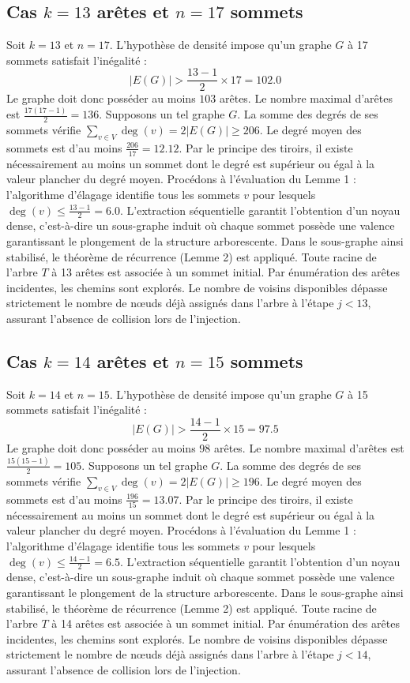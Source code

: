 \documentclass[12pt,a4paper]{article}
\begin{document}
\subsection{Cas $k = 13$ arêtes et $n = 17$ sommets}
Soit $k = 13$ et $n = 17$. L'hypothèse de densité impose qu'un graphe $G$ à 17 sommets satisfait l'inégalité :
$$ |E(G)| > \frac{13-1}{2} \times 17 = 102.0 $$
Le graphe doit donc posséder au moins $103$ arêtes. Le nombre maximal d'arêtes est $\frac{17(17-1)}{2} = 136$.
Supposons un tel graphe $G$. La somme des degrés de ses sommets vérifie $\sum_{v \in V} \deg(v) = 2|E(G)| \geq 206$.
Le degré moyen des sommets est d'au moins $\frac{206}{17} = 12.12$.
Par le principe des tiroirs, il existe nécessairement au moins un sommet dont le degré est supérieur ou égal à la valeur plancher du degré moyen.
Procédons à l'évaluation du Lemme 1 : l'algorithme d'élagage identifie tous les sommets $v$ pour lesquels $\deg(v) \leq \frac{13-1}{2} = 6.0$.
L'extraction séquentielle garantit l'obtention d'un noyau dense, c'est-à-dire un sous-graphe induit où chaque sommet possède une valence garantissant le plongement de la structure arborescente.
Dans le sous-graphe ainsi stabilisé, le théorème de récurrence (Lemme 2) est appliqué. Toute racine de l'arbre $T$ à 13 arêtes est associée à un sommet initial. Par énumération des arêtes incidentes, les chemins sont explorés. Le nombre de voisins disponibles dépasse strictement le nombre de nœuds déjà assignés dans l'arbre à l'étape $j < 13$, assurant l'absence de collision lors de l'injection.

\subsection{Cas $k = 14$ arêtes et $n = 15$ sommets}
Soit $k = 14$ et $n = 15$. L'hypothèse de densité impose qu'un graphe $G$ à 15 sommets satisfait l'inégalité :
$$ |E(G)| > \frac{14-1}{2} \times 15 = 97.5 $$
Le graphe doit donc posséder au moins $98$ arêtes. Le nombre maximal d'arêtes est $\frac{15(15-1)}{2} = 105$.
Supposons un tel graphe $G$. La somme des degrés de ses sommets vérifie $\sum_{v \in V} \deg(v) = 2|E(G)| \geq 196$.
Le degré moyen des sommets est d'au moins $\frac{196}{15} = 13.07$.
Par le principe des tiroirs, il existe nécessairement au moins un sommet dont le degré est supérieur ou égal à la valeur plancher du degré moyen.
Procédons à l'évaluation du Lemme 1 : l'algorithme d'élagage identifie tous les sommets $v$ pour lesquels $\deg(v) \leq \frac{14-1}{2} = 6.5$.
L'extraction séquentielle garantit l'obtention d'un noyau dense, c'est-à-dire un sous-graphe induit où chaque sommet possède une valence garantissant le plongement de la structure arborescente.
Dans le sous-graphe ainsi stabilisé, le théorème de récurrence (Lemme 2) est appliqué. Toute racine de l'arbre $T$ à 14 arêtes est associée à un sommet initial. Par énumération des arêtes incidentes, les chemins sont explorés. Le nombre de voisins disponibles dépasse strictement le nombre de nœuds déjà assignés dans l'arbre à l'étape $j < 14$, assurant l'absence de collision lors de l'injection.
\end{document}
